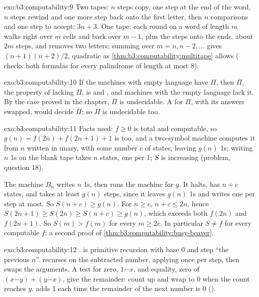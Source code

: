 \begin{solution}{exo:b3:computability:9}
Two tapes: $n$ steps copy, one step at the end of the word, $n$ steps rewind and one more step back onto the first letter, then $n$ comparisons and one step to accept: $3n + 3$. One tape: each round on a word of length $m$ walks right over $m$ cells and back over $m - 1$, plus the steps onto the ends, about $2m$ steps, and removes two letters; summing over $m = n, n - 2, \ldots$ gives $(n + 1)(n + 2)/2$, quadratic as \cref{thm:b3:computability:multitape} allows ( checks both formulas for every palindrome of length at most 8).
\end{solution}

\begin{solution}{exo:b3:computability:10}
If the machines with empty language have $\Pi$, then $\overline{\Pi}$, the property of lacking $\Pi$, is  and , and machines with the empty language lack it. By the case proved in the chapter, $\overline{\Pi}$ is undecidable. A  for $\Pi$, with its answers swapped, would decide $\overline{\Pi}$; so $\Pi$ is undecidable too.
\end{solution}

\begin{solution}{exo:b3:computability:11}
Facts used: $f \ge 0$ is total and computable, so $g(n) = f(2n) + f(2n + 1) + 1$ is too, and a two-symbol machine computes it from $n$ written in unary, with some number $c$ of states, leaving $g(n)$ 1s; writing $n$ 1s on the blank tape takes $n$ states, one per 1; $S$ is increasing (problem, question 18).

The machine $B_n$ writes $n$ 1s, then runs the machine for $g$. It halts, has $n + c$ states, and takes at least $g(n)$ steps, since it leaves $g(n)$ 1s and writes one per step at most. So $S(n + c) \ge g(n)$. For $n \ge c$, $n + c \le 2n$, hence $S(2n + 1) \ge S(2n) \ge S(n + c) \ge g(n)$, which exceeds both $f(2n)$ and $f(2n + 1)$. So $S(m) > f(m)$ for every $m \ge 2c$. In particular $S \ne f$ for every computable $f$: a second proof of \cref{thm:b3:computability:busy-beaver}.
\end{solution}

\begin{solution}{exo:b3:computability:12}
.  is primitive recursion with base 0 and step ``the previous $n$''.  recurses on the subtracted number, applying  once per step, then swaps the arguments. A test for zero, $1 \mathbin{\dot-} x$, and equality, zero of $(x \mathbin{\dot-} y) + (y \mathbin{\dot-} x)$, give the remainder: count up and wrap to 0 when the count reaches $y$.  adds 1 each time the remainder of the next number is 0 ().
\end{solution}

